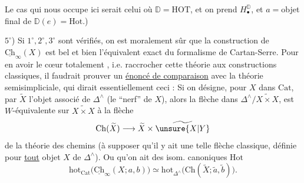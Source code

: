 Le cas qui nous occupe ici serait celui où
$\mathbb D=\mathrm{HOT}$, et on prend $H^{\mathbb D}_{\bullet}$, et $a={}$objet final de
$\mathbb D(e)=\mathrm{Hot}$.)

$5^\circ$) Si $1^\circ,2^\circ,3^\circ$ sont vérifiés, on est moralement
sûr que la construction de $\underline{\mathrm{Ch}}_{\infty}(X)$ est bel
et bien l'équivalent exact du formalisme de
Cartan-Serre. Pour en avoir le cœur totalement
, i.e. raccrocher  cette théorie aux
constructions classiques, il faudrait  prouver un
\uline{énoncé de comparaison} avec la théorie
semisimpliciale, qui dirait essentiellement
ceci : Si on désigne, pour $X$ dans $\mathrm{Cat}$, par
$\widetilde X$ l'objet associé de $\mathbb{\Delta}^{\wedge}$ (le ``nerf'' de $X$),
alors la flèche
 dans $\mathbb{\Delta}^{\wedge}/\widetilde{X\times X}$, est
$W$-équivalente sur $\widetilde{X\times X}$ à la flèche
\[
\mathrm{Ch}(\widetilde X)\longrightarrow\widetilde X\times\widetilde{\unsure{X|Y}}
\]
de la théorie  des chemins (à
supposer qu'il y ait une telle flèche classique,
définie pour \uline{tout} objet $X$ de $\mathbb{\Delta}^{\wedge}$). Ou
qu'on ait  des isom. canoniques  $\mathrm{Hot}$
\[
\mathrm{hot}_{\mathrm{Cat}}\bigl(\underline{\mathrm{Ch}}_{\infty}(X;a,b)\bigr)
\simeq\mathrm{hot}_{\mathbb{\Delta}^{\wedge}}\bigl(\mathrm{Ch}(\widetilde X;\tilde a,\tilde b)\bigr).
\]
